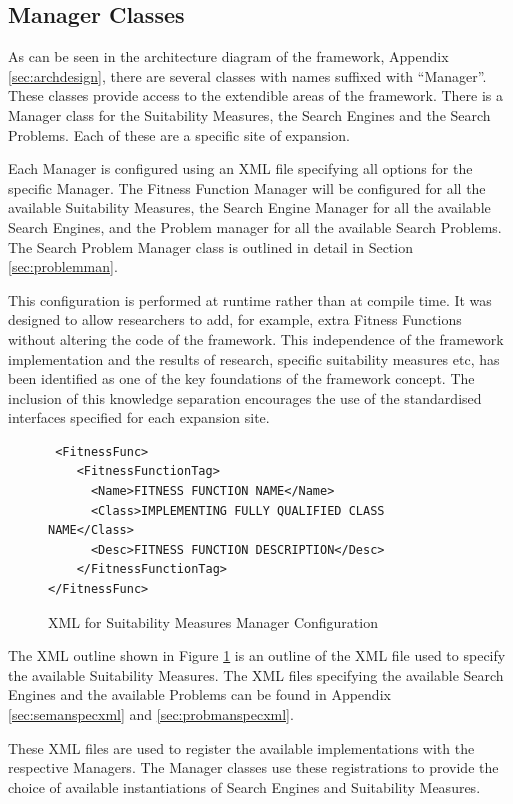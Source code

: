 \subsection{Manager Classes}
\label{sec:manclasses}
As can be seen in the architecture diagram of the framework, Appendix \ref{sec:archdesign}, there are several classes with names suffixed with ``Manager''.
These classes provide access to the extendible areas of the framework.
There is a Manager class for the Suitability Measures, the Search Engines and the Search Problems.
Each of these are a specific site of expansion.

Each Manager is configured using an XML file specifying all options for the specific Manager.
The Fitness Function Manager will be configured for all the available Suitability Measures, the Search Engine Manager for all the available Search Engines, and the Problem manager for all the available Search Problems.
The Search Problem Manager class is outlined in detail in Section \ref{sec:problemman}.

This configuration is performed at runtime rather than at compile time.
It was designed to allow researchers to add, for example, extra Fitness Functions without altering the code of the framework.
This independence of the framework implementation and the results of research, specific suitability measures etc, has been identified as one of the key foundations of the framework concept.
The inclusion of this knowledge separation encourages the use of the standardised interfaces specified for each expansion site.

\lstset{language=XML}
\begin{figure}
\begin{lstlisting}
 <FitnessFunc>
	<FitnessFunctionTag>
	  <Name>FITNESS FUNCTION NAME</Name>
	  <Class>IMPLEMENTING FULLY QUALIFIED CLASS NAME</Class>
	  <Desc>FITNESS FUNCTION DESCRIPTION</Desc>
	</FitnessFunctionTag>
</FitnessFunc>
\end{lstlisting}
\caption{XML for Suitability Measures Manager Configuration}
\label{code:fitfuntmanconfig}
\end{figure}

The XML outline shown in Figure \ref{code:fitfuntmanconfig} is an outline of the XML file used to specify the available Suitability Measures.
The XML files specifying the available Search Engines and the available Problems can be found in Appendix \ref{sec:semanspecxml} and \ref{sec:probmanspecxml}.

These XML files are used to register the available implementations with the respective Managers.
The Manager classes use these registrations to provide the choice of available instantiations of Search Engines and Suitability Measures.

